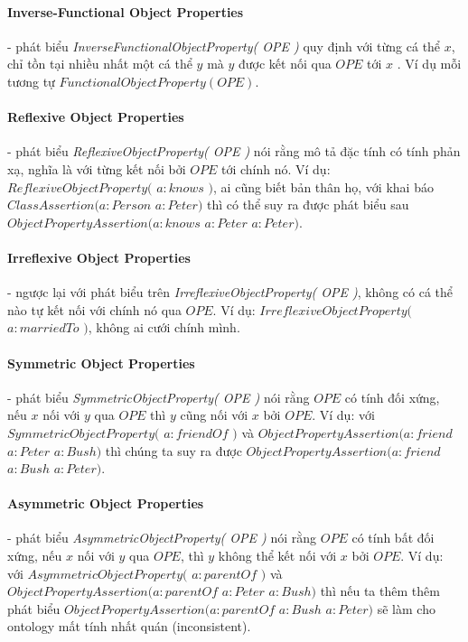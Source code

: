 \paragraph{Inverse-Functional Object Properties} - phát biểu \textit{InverseFunctionalObjectProperty( OPE )} quy định với từng cá thể $x$, chỉ tồn tại nhiều nhất một cá thể $y$ mà $y$ được kết nối qua $OPE$ tới $x$ . Ví dụ mỗi tương tự $FunctionalObjectProperty(OPE)$.

\paragraph{Reflexive Object Properties} - phát biểu \textit{ReflexiveObjectProperty( OPE )} nói rằng mô tả đặc tính có tính phản xạ, nghĩa là với từng kết nối bởi $OPE$ tới chính nó. Ví dụ: $ReflexiveObjectProperty($ $a:knows$ $)$, ai cũng biết bản thân họ, với khai báo $ClassAssertion(a:Person$ $a:Peter)$ thì có thể suy ra được phát biểu sau $ObjectPropertyAssertion(a:knows$ $a:Peter$ $a:Peter)$.

\paragraph{Irreflexive Object Properties} - ngược lại với phát biểu trên  \textit{IrreflexiveObjectProperty( OPE )}, không có cá thể nào tự kết nối với chính nó qua $OPE$. Ví dụ: $IrreflexiveObjectProperty($ $a:marriedTo$ $)$, không ai cưới chính mình.

\paragraph{Symmetric Object Properties} - phát biểu \textit{SymmetricObjectProperty( OPE )} nói rằng $OPE$ có tính đối xứng, nếu $x$ nối với $y$ qua $OPE$ thì $y$ cũng nối với $x$ bởi $OPE$. Ví dụ: với $SymmetricObjectProperty($ $a:friendOf$ $)$ và $ObjectPropertyAssertion(a:friend$ $a:Peter$ $a:Bush)$ thì chúng ta suy ra được $ObjectPropertyAssertion(a:friend$ $a:Bush$ $a:Peter)$.

\paragraph{Asymmetric Object Properties} - phát biểu \textit{AsymmetricObjectProperty( OPE )} nói rằng $OPE$ có tính bất đối xứng, nếu $x$ nối với $y$ qua $OPE$, thì $y$ không thể kết nối với $x$ bởi $OPE$. Ví dụ: với $AsymmetricObjectProperty($ $a:parentOf$ $)$  và $ObjectPropertyAssertion(a:parentOf$ $a:Peter$ $a:Bush)$ thì nếu ta thêm thêm phát biểu $ObjectPropertyAssertion(a:parentOf$ $a:Bush$ $a:Peter)$ sẽ làm cho ontology mất tính nhất quán (inconsistent).

